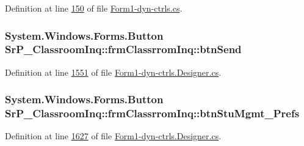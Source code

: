 \-Definition at line \hyperlink{_form1-dyn-ctrls_8cs_source_l00150}{150} of file \hyperlink{_form1-dyn-ctrls_8cs_source}{\-Form1-\/dyn-\/ctrls.\-cs}.

\hypertarget{class_sr_p___classroom_inq_1_1frm_classrrom_inq_a5a1b78305ac1e8f7eb40a5d135fa3525}{
\subsubsection[{btn\-Send}]{\setlength{\rightskip}{0pt plus 5cm}\-System.\-Windows.\-Forms.\-Button {\bf \-Sr\-P\-\_\-\-Classroom\-Inq\-::frm\-Classrrom\-Inq\-::btn\-Send}}}
\label{class_sr_p___classroom_inq_1_1frm_classrrom_inq_a5a1b78305ac1e8f7eb40a5d135fa3525}


\-Definition at line \hyperlink{_form1-dyn-ctrls_8_designer_8cs_source_l01551}{1551} of file \hyperlink{_form1-dyn-ctrls_8_designer_8cs_source}{\-Form1-\/dyn-\/ctrls.\-Designer.\-cs}.

\hypertarget{class_sr_p___classroom_inq_1_1frm_classrrom_inq_af14017019a644ec6c1d32d49fb0e59f1}{
\subsubsection[{btn\-Stu\-Mgmt\-\_\-\-Prefs}]{\setlength{\rightskip}{0pt plus 5cm}\-System.\-Windows.\-Forms.\-Button {\bf \-Sr\-P\-\_\-\-Classroom\-Inq\-::frm\-Classrrom\-Inq\-::btn\-Stu\-Mgmt\-\_\-\-Prefs}}}
\label{class_sr_p___classroom_inq_1_1frm_classrrom_inq_af14017019a644ec6c1d32d49fb0e59f1}


\-Definition at line \hyperlink{_form1-dyn-ctrls_8_designer_8cs_source_l01627}{1627} of file \hyperlink{_form1-dyn-ctrls_8_designer_8cs_source}{\-Form1-\/dyn-\/ctrls.\-Designer.\-cs}.

